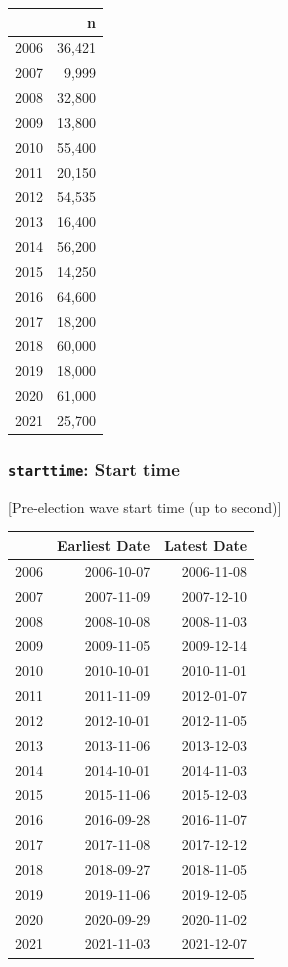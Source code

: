 \documentclass[10pt,article,oneside]{memoir}
\theoremstyle{definition}
\begin{document}
\begin{table}[H]
\centering
\begin{tabular}[t]{lr}
\toprule
 & n\\
\midrule
2006 & 36,421\\
2007 & 9,999\\
2008 & 32,800\\
2009 & 13,800\\
2010 & 55,400\\
2011 & 20,150\\
2012 & 54,535\\
2013 & 16,400\\
2014 & 56,200\\
2015 & 14,250\\
2016 & 64,600\\
2017 & 18,200\\
2018 & 60,000\\
2019 & 18,000\\
2020 & 61,000\\
2021 & 25,700\\
\bottomrule
\end{tabular}
\end{table}

\hypertarget{starttime-start-time}{%
\subsubsection{\texorpdfstring{\texttt{starttime}: Start
time}{starttime: Start time}}\label{starttime-start-time}}

{[}Pre-election wave start time (up to second){]}

\begin{table}
\centering
\begin{tabular}{lrr}
\toprule
 & Earliest Date & Latest Date\\
\midrule
2006 & 2006-10-07 & 2006-11-08\\
2007 & 2007-11-09 & 2007-12-10\\
2008 & 2008-10-08 & 2008-11-03\\
2009 & 2009-11-05 & 2009-12-14\\
2010 & 2010-10-01 & 2010-11-01\\
2011 & 2011-11-09 & 2012-01-07\\
2012 & 2012-10-01 & 2012-11-05\\
2013 & 2013-11-06 & 2013-12-03\\
2014 & 2014-10-01 & 2014-11-03\\
2015 & 2015-11-06 & 2015-12-03\\
2016 & 2016-09-28 & 2016-11-07\\
2017 & 2017-11-08 & 2017-12-12\\
2018 & 2018-09-27 & 2018-11-05\\
2019 & 2019-11-06 & 2019-12-05\\
2020 & 2020-09-29 & 2020-11-02\\
2021 & 2021-11-03 & 2021-12-07\\
\bottomrule
\end{tabular}
\end{table}
\end{document}

